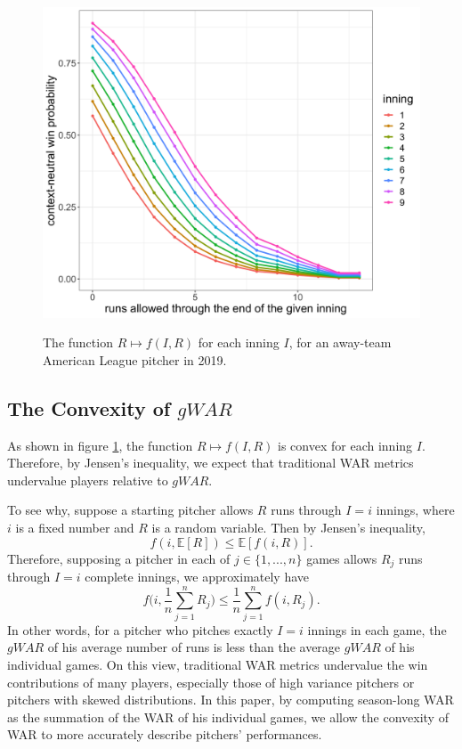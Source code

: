 \documentclass[12pt]{article}
\newcommand{\E}{{\mathbb E}}
\begin{document}
\begin{figure}[t!]
\centering
\caption{The function $R \mapsto f(I,R)$ for each inning $I$, for an away-team American League pitcher in 2019.} 
\includegraphics[width=15cm]{../writeup_plots/plot_fIR_R_smoothed.png}
\label{fig:fR}
\end{figure}

\subsection{The Convexity of $gWAR$}\label{sec:convexityOfWAR}

As shown in figure \ref{fig:fR}, the function $R \mapsto f(I,R)$ is convex for each inning $I$. Therefore, by Jensen's inequality, we expect that traditional WAR metrics undervalue players relative to $gWAR$. 

To see why, suppose a starting pitcher allows $R$ runs through $I = i$ innings, where $i$ is a fixed number and $R$ is a random variable. Then by Jensen's inequality, 
\begin{equation}
f(i, \E[R]) \leq \E[f(i,R)].
\label{eqn:jensen1}
\end{equation}
Therefore, supposing a pitcher in each of $j \in \{1,...,n\}$ games allows $R_j$ runs through $I=i$ complete innings, we approximately have
\begin{equation}
f\bigg(i, \frac{1}{n}\sum_{j=1}^{n} R_j\bigg) \leq \frac{1}{n}\sum_{j=1}^{n} f(i,R_j).
\label{eqn:jensen2}
\end{equation}
In other words, for a pitcher who pitches exactly $I=i$ innings in each game, the $gWAR$ of his average number of runs is less than the average $gWAR$ of his individual games. On this view, traditional WAR metrics undervalue the win contributions of many players, especially those of high variance pitchers or pitchers with skewed distributions. In this paper, by computing season-long WAR as the summation of the WAR of his individual games, we allow the convexity of WAR to more accurately describe pitchers' performances. 
\end{document}
